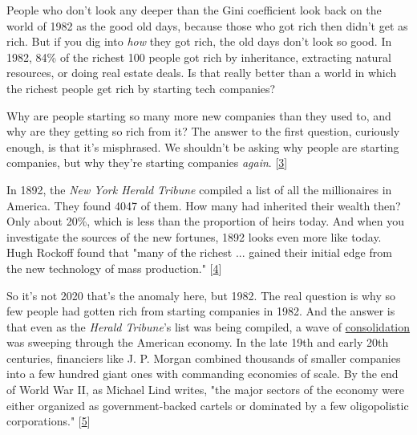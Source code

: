 People who don't look any
                  deeper than the Gini coefficient look back on the world of
                  1982 as the good old days, because those who got rich then
                  didn't get as rich. But if you dig into \emph{how} they got
                  rich, the old days don't look so good. In 1982, 84\% of the
                  richest 100 people got rich by inheritance, extracting natural
                  resources, or doing real estate deals. Is that really better
                  than a world in which the richest people get rich by starting
                  tech companies?

Why are people starting so many
                  more new companies than they used to, and why are they getting
                  so rich from it? The answer to the first question, curiously
                  enough, is that it's misphrased. We shouldn't be asking why
                  people are starting companies, but why they're starting
                  companies \emph{again}.
                  [\href{\#f3n}{3}]

In 1892, the
                  \emph{New York Herald Tribune} compiled a list of all the
                  millionaires in America. They found 4047 of them. How many had
                  inherited their wealth then? Only about 20\%, which is less
                  than the proportion of heirs today. And when you investigate
                  the sources of the new fortunes, 1892 looks even more like
                  today. Hugh Rockoff found that "many of the richest ... gained
                  their initial edge from the new technology of mass
                  production."
                  [\href{\#f4n}{4}]

So it's not 2020 that's the anomaly here, but
                  1982. The real question is why so few people had gotten rich
                  from starting companies in 1982. And the answer is that even
                  as the \emph{Herald Tribune}'s list was being compiled, a wave
                  of \href{http://www.paulgraham.com/re.html}{\underline{consolidation}}
                  was sweeping through the American economy. In the late 19th
                  and early 20th centuries, financiers like J. P. Morgan
                  combined thousands of smaller companies into a few hundred
                  giant ones with commanding economies of scale. By the end of
                  World War II, as Michael Lind writes, "the major sectors of
                  the economy were either organized as government-backed cartels
                  or dominated by a few oligopolistic corporations."
                  [\href{\#f5n}{5}]

